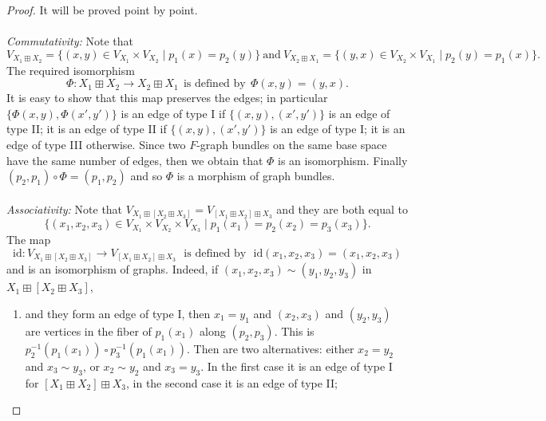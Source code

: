 \documentclass{amsart}
\theoremstyle{definition}
\numberwithin{equation}{section}
\begin{document}
\begin{proof}It will be proved point by point.\\
\\
\textit{Commutativity:} Note that \begin{equation}V_{X_1 \boxplus X_2} = \{(x,y) \in V_{X_1}\times V_{X_2} \mid p_1(x)=p_2(y)\} \ \mbox{and}  \ V_{X_2 \boxplus X_1} = \{(y,x) \in V_{X_2} \times V_{X_1}\mid p_2(y)=p_1(x)\}.\end{equation} The required isomorphism  \begin{equation}
\Phi: X_1 \boxplus X_2 \longrightarrow X_2 \boxplus X_1  \ \ \mbox{is defined by}   \ \ \Phi(x,y) = (y,x).\end{equation} It is easy to show that this map preserves the edges; in particular $\{\Phi(x,y),\Phi(x',y')\}$ is an edge of type I if $\{(x,y), (x', y')\}$ is an edge of type II; it is an edge of type II if $\{(x,y), (x', y')\}$ is an edge of type I; it is an edge of type III otherwise. Since two $F$-graph bundles on the same base space have the same number of edges, then we obtain that $\Phi$ is an isomorphism. Finally $(p_2,p_1) \circ \Phi = (p_1,p_2)$ and so $\Phi$ is a morphism of graph bundles.\\
\\
\textit{Associativity:} Note that $V_{X_1 \boxplus [X_2 \boxplus X_3]} = V_{[X_1 \boxplus X_2] \boxplus X_3}$ and they are both equal to
\begin{equation}
\{(x_1, x_2, x_3) \in V_{X_1} \times V_{X_2} \times V_{X_3} \mid p_1(x_1) = p_2(x_2) = p_3(x_3)\}.
\end{equation}
The map \begin{equation}\label{identity} \mathrm{id} : V_{X_1 \boxplus [X_2 \boxplus X_3]} \longrightarrow V_{[X_1 \boxplus X_2] \boxplus X_3}  \  \ \ \mbox{is defined by} \  \ \ \mathrm{id}(x_1,x_2,x_3) = (x_1,x_2,x_3)\end{equation} and is an isomorphism of graphs. Indeed, if $(x_1, x_2, x_3)\sim (y_1, y_2, y_3)$ in $X_1 \boxplus [X_2 \boxplus X_3]$, 
\begin{enumerate}
\item[(1).] and they form an edge of type I, then $x_1 = y_1$ and $(x_2, x_3)$ and $(y_2, y_3)$ are vertices in the fiber of $p_1(x_1)$ along $(p_2,p_3)$. This is $p_{2}^{-1}(p_1(x_1))  \ \square  \ p_{3}^{-1}(p_1(x_1))$. Then are two alternatives: either $x_2 = y_2$ and $x_3 \sim y_3$, or $x_2 \sim y_2$ and $x_3 = y_3$. In the first case it is an edge of type I for $[X_1 \boxplus X_2] \boxplus X_3$, in the second case it is an edge of type II;


\end{enumerate}
\end{proof}
\end{document}
